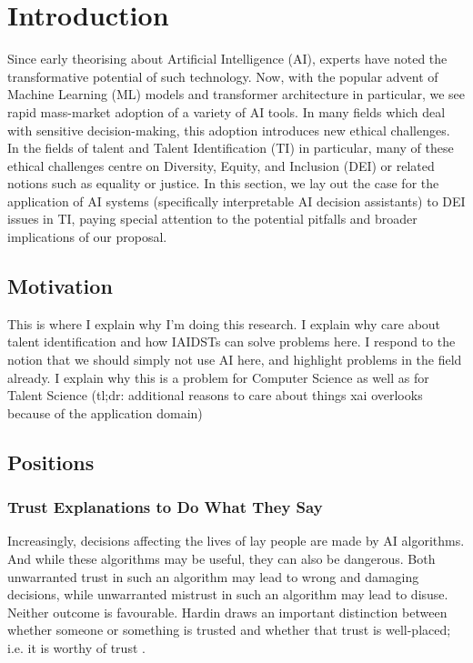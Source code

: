 

\chapter{\label{ch:intro}Introduction} 

\minitoc

Since early theorising about Artificial Intelligence (AI), experts have noted the transformative potential of such technology. Now, with the popular advent of Machine Learning (ML) models and transformer architecture in particular, we see rapid mass-market adoption of a variety of AI tools. In many fields which deal with sensitive decision-making, this adoption introduces new ethical challenges. In the fields of talent and Talent Identification (TI) in particular, many of these ethical challenges centre on Diversity, Equity, and Inclusion (DEI) or related notions such as equality or justice. In this section, we lay out the case for the application of AI systems (specifically interpretable AI decision assistants) to DEI issues in TI, paying special attention to the potential pitfalls and broader implications of our proposal.

\section{Motivation} %
This is where I explain why I'm doing this research. I explain why care about talent identification and how IAIDSTs can solve problems here. I respond to the notion that we should simply not use AI here, and highlight problems in the field already. I explain why this is a problem for Computer Science as well as for Talent Science (tl;dr: additional reasons to care about things xai overlooks because of the application domain)

\section{Positions}
\subsection{Trust Explanations to Do What They Say} 
Increasingly, decisions affecting the lives of lay people are made by AI algorithms. And while these algorithms may be useful, they can also be dangerous. Both unwarranted trust in such an algorithm may lead to wrong and damaging decisions, while unwarranted mistrust in such an algorithm may lead to disuse. Neither outcome is favourable. Hardin draws an important distinction between whether someone or something is trusted and whether that trust is well-placed; i.e. it is worthy of trust \cite{hardin_trust_2002}. 

